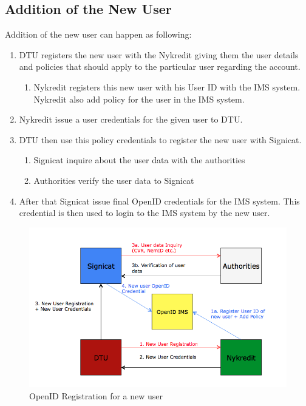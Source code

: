 \subsection{Addition of the New User}
Addition of the new user can happen as following:
\begin{enumerate}
	\item DTU registers the new user with the Nykredit giving them the user details and policies that should apply to the particular user regarding the account. 
	\begin{enumerate}
		\item Nykredit registers this new user with his User ID with the IMS system. Nykredit also add policy for the user in the IMS system.
	\end{enumerate}
	\item Nykredit issue a user credentials for the given user to DTU.
	\item DTU then use this policy credentials to register the new user with Signicat. 
	\begin{enumerate}
		\item Signicat inquire about the user data with the authorities
		\item Authorities verify the user data to Signicat
	\end{enumerate}
	\item After that Signicat issue final OpenID credentials for the IMS system.  This credential is then used to login to the IMS system by the new user.
\end{enumerate}
\begin{figure}[h]
	\centering
	\includegraphics[width=\textwidth]{figures/OpenID-Real}
	\caption{OpenID Registration for a new user}
	\label{fig:OpenID-Real}
\end{figure}

